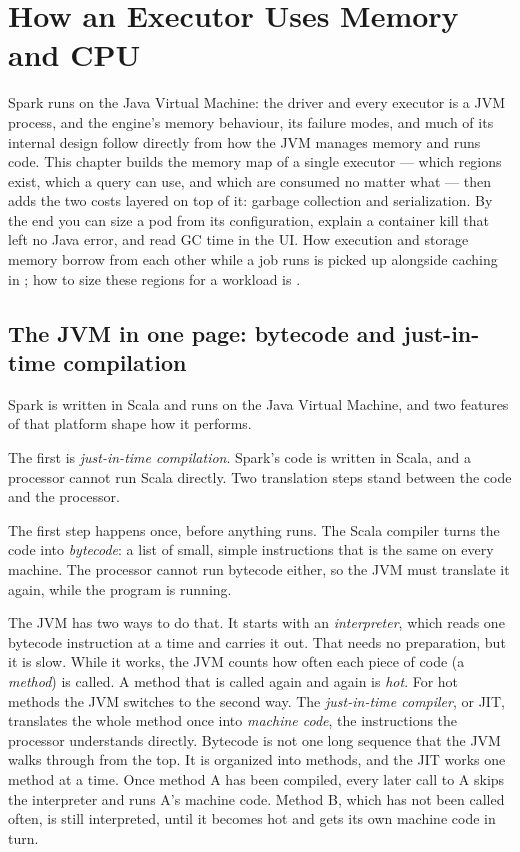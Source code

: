 \chapter{How an Executor Uses Memory and CPU}
\label{ch:execmem}

\begin{chapterintro}
Spark runs on the Java Virtual Machine: the driver and every executor is a JVM
process, and the engine's memory behaviour, its failure modes, and much of its
internal design follow directly from how the JVM manages memory and runs code.
This chapter builds the memory map of a single executor --- which regions exist,
which a query can use, and which are consumed no matter what --- then adds the
two costs layered on top of it: garbage collection and serialization. By the end
you can size a pod from its configuration, explain a container kill that left no
Java error, and read GC time in the UI. How execution and storage memory borrow
from each other while a job runs is picked up alongside caching in
; how to size these regions for a workload is .
\end{chapterintro}

\section{The JVM in one page: bytecode and just-in-time compilation}
\label{sec:mem-jvm}

Spark is written in Scala and runs on the Java Virtual Machine, and two features
of that platform shape how it performs.

The first is \emph{just-in-time compilation}. Spark's code is written in Scala,
and a processor cannot run Scala directly. Two translation steps stand between the
code and the processor.

The first step happens once, before anything runs. The Scala compiler turns the code
into \emph{bytecode}: a list of small, simple instructions that is the same on every
machine. The processor cannot run bytecode either, so the JVM must translate it
again, while the program is running.

The JVM has two ways to do that. It starts with an \emph{interpreter}, which reads
one bytecode instruction at a time and carries it out. That needs no preparation,
but it is slow. While it works, the JVM counts how often each piece of code (a
\emph{method}) is called. A method that is called again and again is \emph{hot}.
For hot methods the JVM switches to the second way. The \emph{just-in-time
compiler}, or JIT, translates the whole method once into \emph{machine code}, the
instructions the processor understands directly. Bytecode is not one long
sequence that the JVM walks through from the top. It is organized into methods, and
the JIT works one method at a time. Once method A has been compiled, every later
call to A skips the interpreter and runs A's machine code. Method B, which has not
been called often, is still interpreted, until it becomes hot and gets its own
machine code in turn.

